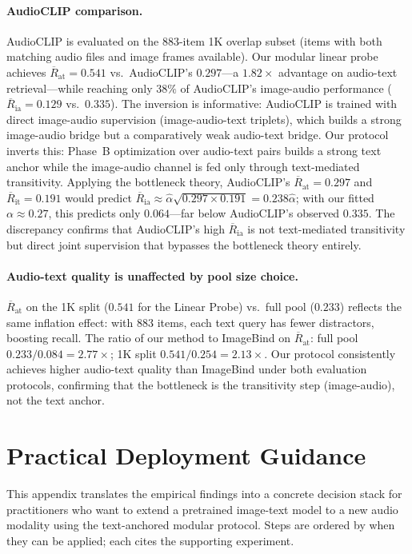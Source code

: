 \documentclass{article}
\newcommand{\avgR}{\overline{R}}
\begin{document}
\paragraph{AudioCLIP comparison.}
AudioCLIP \citep{guzhov2022audioclip} is evaluated on the 883-item 1K overlap subset (items with both matching audio files and image frames available).
Our modular linear probe achieves $\avgR_\mathrm{at}=0.541$ vs.\ AudioCLIP's $0.297$---a $1.82\times$ advantage on audio-text retrieval---while reaching only $38\%$ of AudioCLIP's image-audio performance ($\avgR_\mathrm{ia}=0.129$ vs.\ $0.335$).
The inversion is informative: AudioCLIP is trained with direct image-audio supervision (image-audio-text triplets), which builds a strong image-audio bridge but a comparatively weak audio-text bridge.
Our protocol inverts this: Phase~B optimization over audio-text pairs builds a strong text anchor while the image-audio channel is fed only through text-mediated transitivity.
Applying the bottleneck theory, AudioCLIP's $\avgR_\mathrm{at}=0.297$ and $\avgR_\mathrm{it}=0.191$ would predict $\avgR_\mathrm{ia} \approx \hat{\alpha}\sqrt{0.297\times 0.191} = 0.238\hat{\alpha}$; with our fitted $\alpha \approx 0.27$, this predicts only $0.064$---far below AudioCLIP's observed $0.335$.
The discrepancy confirms that AudioCLIP's high $\avgR_\mathrm{ia}$ is not text-mediated transitivity but direct joint supervision that bypasses the bottleneck theory entirely.

\paragraph{Audio-text quality is unaffected by pool size choice.}
$\avgR_\mathrm{at}$ on the 1K split ($0.541$ for the Linear Probe) vs.\ full pool ($0.233$) reflects the same inflation effect: with 883 items, each text query has fewer distractors, boosting recall.
The ratio of our method to ImageBind on $\avgR_\mathrm{at}$: full pool $0.233/0.084 = 2.77\times$; 1K split $0.541/0.254 = 2.13\times$.
Our protocol consistently achieves higher audio-text quality than ImageBind under both evaluation protocols, confirming that the bottleneck is the transitivity step (image-audio), not the text anchor.

\section{Practical Deployment Guidance}
\label{app:deployment}

This appendix translates the empirical findings into a concrete decision stack for practitioners
who want to extend a pretrained image-text model to a new audio modality using the text-anchored
modular protocol.
Steps are ordered by when they can be applied; each cites the supporting experiment.
\end{document}
